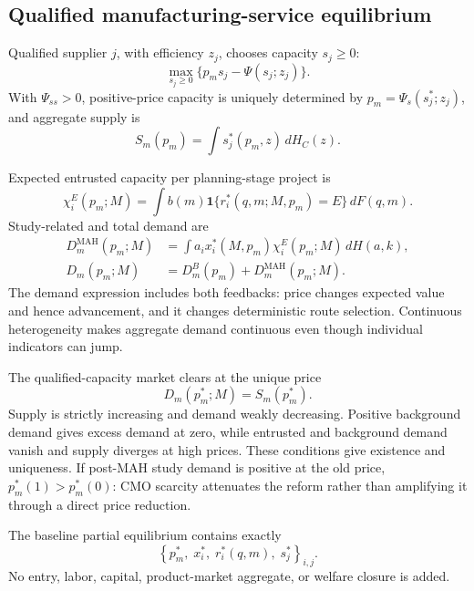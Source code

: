 \documentclass[12pt]{article}
\newcommand{\1}{\mathbf{1}}
\begin{document}
\subsection{Qualified manufacturing-service equilibrium}
\label{subsec:p16m-cmo}

Qualified supplier \(j\), with efficiency \(z_j\), chooses capacity
\(s_j\geq0\):
\begin{equation}
  \max_{s_j\geq0}\{p_ms_j-\Psi(s_j;z_j)\}.
  \label{eq:p16m-supplier}
\end{equation}
With \(\Psi_{ss}>0\), positive-price capacity is uniquely determined by
\(p_m=\Psi_s(s_j^*;z_j)\), and aggregate supply is
\[
  S_m(p_m)=\int s_j^*(p_m,z)\,dH_C(z).
\]

Expected entrusted capacity per planning-stage project is
\begin{equation}
  \chi_i^E(p_m;M)
  =
  \int b(m)\mathbf 1\{r_i^*(q,m;M,p_m)=E\}\,dF(q,m).
  \label{eq:p16m-project-demand}
\end{equation}
Study-related and total demand are
\begin{equation}
  \begin{aligned}
  D_m^{\mathrm{MAH}}(p_m;M)
  &=
  \int a_ix_i^*(M,p_m)\chi_i^E(p_m;M)\,dH(a,k),\\
  D_m(p_m;M)
  &=D_m^B(p_m)+D_m^{\mathrm{MAH}}(p_m;M).
  \end{aligned}
  \label{eq:p16m-demand}
\end{equation}
The demand expression includes both feedbacks: price changes expected value
and hence advancement, and it changes deterministic route selection.
Continuous heterogeneity makes aggregate demand continuous even though
individual indicators can jump.

The qualified-capacity market clears at the unique price
\begin{equation}
  D_m(p_m^*;M)=S_m(p_m^*).
  \label{eq:p16m-clearing}
\end{equation}
Supply is strictly increasing and demand weakly decreasing. Positive
background demand gives excess demand at zero, while entrusted and
background demand vanish and supply diverges at high prices. These conditions
give existence and uniqueness. If post-MAH study demand is positive at the
old price, \(p_m^*(1)>p_m^*(0)\): CMO scarcity attenuates the reform rather
than amplifying it through a direct price reduction.

The baseline partial equilibrium contains exactly
\begin{equation}
  \left\{
  p_m^*,\;
  x_i^*,\;
  r_i^*(q,m),\;
  s_j^*
  \right\}_{i,j}.
  \label{eq:p16m-equilibrium}
\end{equation}
No entry, labor, capital, product-market aggregate, or welfare closure is
added.
\end{document}
